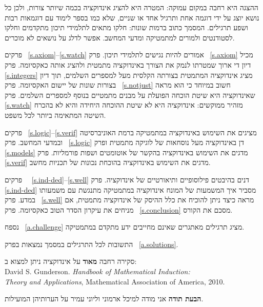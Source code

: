 ההצגה היא רחבה במקום עמוקה: המטרה היא להציג אינדוקציה בכמה שיותר צורות, ולכן כל נושא יוצג על ידי דוגמה אחת ותרגיל אחד או שניים, שלא כמו בספר לימוד עם דוגמאות רבות ושפע תרגילים. המסמך כתוב ברמות שונות: חלקו מתאים לתלמידי תיכון מתקדמים וחלקו לסטודנטים ולמורים למתמטיקה ומדעי המחשב. אפשר לדלג על נושאים לא מוכרים.

פרקים~%
\ref{s.axiom}--\ref{s.watch}
אמורים להיות נגישים לתלמידי תיכון. פרק~%
\ref{s.axiom}
מכיל דיון די ארוך שמטרתו לנמק את הצורך באינדוקציה מתמטית ולהציג אותה כאקסיומה. פרק~%
\ref{s.integers}
מציג אינדוקציה המתמטית בצורתה הקלסית מעל למספרים השלמים, תוך דיון בצורות שונות של יישום האקסיומה. פרק~%
\ref{s.notjust}
חשוב במיוחד כי הוא מראה שאינדוקציה היא שיטת הוכחה הפועלת על מבנים מתמטיים בנוסף למספרים השלמים. פרק~%
\ref{s.watch}
מזהיר ממוקשים: אינדוקציה היא לא שיטת ההוכחה היחידה והיא לא בהכרח השיטה המתאימה ביותר לכל משפט.

פרקים~%
\ref{s.logic}--\ref{s.verif}
מציגים את השימוש באינדוקציה במתמטיקה ברמת האוניברסיטה ובמדעי המחשב. פרק~%
\ref{s.logic}
דן באינדוקציה מעל נוסחאות של לוגיקה מתמטית ופרק~%
\ref{s.models}
מדגים את השימוש באינדוקציה בהקשר של אוטומטים ושפות פורמליות. פרק~%
\ref{s.verif}
מדגים את השימוש באינדוקציה בהוכחת נכונות של תכניות מחשב.

פרקים~%
~\ref{s.ind-ded}--\ref{s.well}
דנים בהיבטים פילוסופיים ותיאורטיים של אינדוקציה. פרק~%
\ref{s.ind-ded}
מסביר איך המשמעות של המונח אינדוקציה במתמטיקה מתנגשת עם משמעותו במדע. פרק~%
\ref{s.well}
מראה כיצד ניתן להוכיח את כלל ההיסק של אינדוקציה מתמטית, אם מניחים את עיקרון הסדר הטוב כאקסיומה. פרק~%
\ref{s.conclusion}
מסכם את הקורס.

נספח~%
\ref{a.challenge}
מציג תרגילים מאתגרים שאינם מחייבים ידע מתקדם במתמטיקה.

התשובות לכל התרגילים במסמך נמצאות בפרק~%
\ref{a.solutions}.

\smallskip

סקירה רחבה 
\textbf{מאוד}
על אינדוקציה ניתן למצוא ב:\\
\hspace*{-8pt} David S. Gunderson. \textit{Handbook of Mathematical Induction:\\Theory and Applications},
Mathematical Association of America, 2010.


\bigskip


\textbf{הבעת תודה}
אני מודה למיכל ארמוני וליוני עמיר על הערותיהן המועילות.

